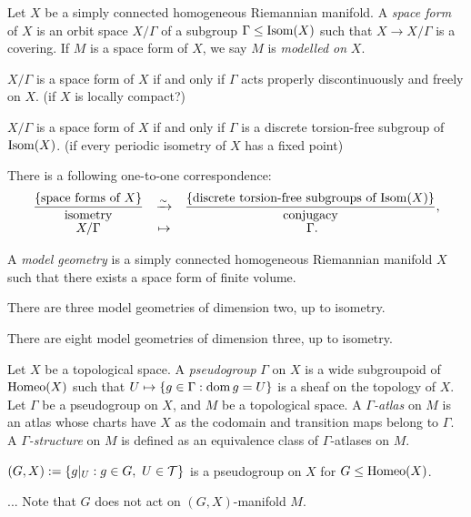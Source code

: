 \documentclass{../../large}
\begin{document}
\begin{prb}
Let $X$ be a simply connected homogeneous Riemannian manifold.
A \emph{space form} of $X$ is an orbit space $X/\Gamma$ of a subgroup $\Gamma\le\operatorname{Isom}(X)$ such that $X\to X/\Gamma$ is a covering.
If $M$ is a space form of $X$, we say $M$ is \emph{modelled on} $X$.
\begin{parts}
\item $X/\Gamma$ is a space form of $X$ if and only if $\Gamma$ acts properly discontinuously and freely on $X$. (if $X$ is locally compact?)
\item $X/\Gamma$ is a space form of $X$ if and only if $\Gamma$ is a discrete torsion-free subgroup of $\operatorname{Isom}(X)$. (if every periodic isometry of $X$ has a fixed point)
\item There is a following one-to-one correspondence:
\[\begin{array}{ccc}
\dfrac{\{\text{space forms of $X$}\}}{\text{isometry}}
&\xrightarrow{\sim}&
\dfrac{\{\text{discrete torsion-free subgroups of $\operatorname{Isom}(X)$}\}}{\text{conjugacy}},\\
X/\Gamma&\mapsto&\Gamma.
\end{array}\]
\end{parts}
\end{prb}
\begin{pf}

\end{pf}


\begin{prb}
A \emph{model geometry} is a simply connected homogeneous Riemannian manifold $X$ such that there exists a space form of finite volume.
\begin{parts}
\item There are three model geometries of dimension two, up to isometry.
\item There are eight model geometries of dimension three, up to isometry.
\end{parts}
\end{prb}
\begin{pf}

\end{pf}



\begin{prb}[$(G,X)$-manifolds]
Let $X$ be a topological space.
A \emph{pseudogroup} $\Gamma$ on $X$ is a wide subgroupoid of $\operatorname{Homeo}(X)$ such that $U\mapsto\{g\in\Gamma:\operatorname{dom} g=U\}$ is a sheaf on the topology of $X$.
Let $\Gamma$ be a pseudogroup on $X$, and $M$ be a topological space.
A \emph{$\Gamma$-atlas} on $M$ is an atlas whose charts have $X$ as the codomain and transition maps belong to $\Gamma$.
A \emph{$\Gamma$-structure} on $M$ is defined as an equivalence class of $\Gamma$-atlases on $M$.
\begin{parts}
\item $(G,X):=\{g|_U:g\in G,\ U\in\mathcal{T}\}$ is a pseudogroup on $X$ for $G\le\operatorname{Homeo}(X)$.
\item...
Note that $G$ does not act on $(G,X)$-manifold $M$.
\end{parts}
\end{prb}
\end{document}
